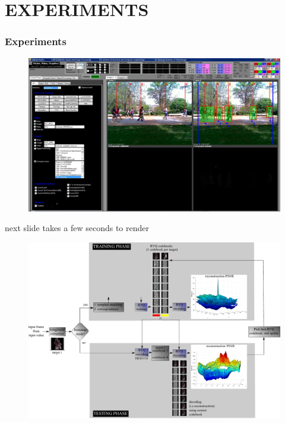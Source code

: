 \section{EXPERIMENTS}
\begin{frame}
\frametitle{Experiments}
\logoCSIPCPL\mypagenum
	\begin{figure}		
		\centering		
		\includegraphics[width=1.0\textwidth]{figs/Proposal_fig3_RVQ_MTT_snapshot_VVG}
		\label{fig:snapshot_VVG}
	\end{figure}	
	next slide takes a few seconds to render
\end{frame}


\begin{frame}[plain]
	\begin{changemargin}{-1.3in}{0in}
	\begin{figure}		
		\includegraphics[width=1.37\textwidth]{figs/RVQ_TRK_IPCV2010_BlockDiagram_detailed.pdf}
	\end{figure}	
	\end{changemargin}
\end{frame}

